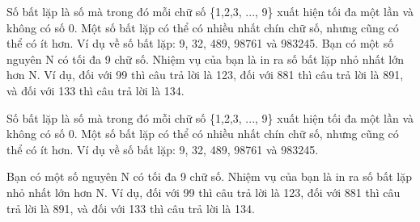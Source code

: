 Số bất lặp là số mà trong đó mỗi chữ số \{1,2,3, ..., 9\} xuất hiện tối đa một lần và không có số 0.       Một số bất lặp có thể có nhiều nhất chín chữ số, nhưng cũng có thể có ít hơn. Ví dụ về số bất lặp:       9, 32, 489, 98761 và 983245.       Bạn có một số nguyên N có tối đa 9 chữ số. Nhiệm vụ của bạn là in ra số bất lặp nhỏ nhất lớn       hơn N. Ví dụ, đối với 99 thì câu trả lời là 123, đối với 881 thì câu trả lời là 891, và đối với 133       thì câu trả lời là 134.    

   Số bất lặp là số mà trong đó mỗi chữ số \{1,2,3, ..., 9\} xuất hiện tối đa một lần và không có số 0. Một số bất lặp có thể có nhiều nhất chín chữ số, nhưng cũng có thể có ít hơn. Ví dụ về số bất lặp: 9, 32, 489, 98761 và 983245.  

   Bạn có một số nguyên N có tối đa 9 chữ số. Nhiệm vụ của bạn là in ra số bất lặp nhỏ nhất lớn hơn N. Ví dụ, đối với 99 thì câu trả lời là 123, đối với 881 thì câu trả lời là 891, và đối với 133 thì câu trả lời là 134.